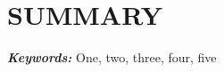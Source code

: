 \chapter{SUMMARY}
\lipsum[7-9]




\noindent
\textbf{\textit{Keywords:}}
One, two, three, four, five